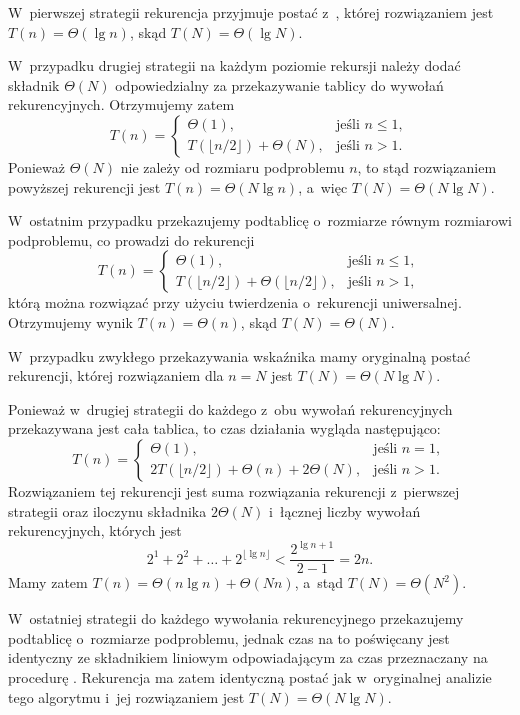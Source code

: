 
\subproblem %
W~pierwszej strategii rekurencja przyjmuje postać z~, której rozwiązaniem jest $T(n)=\Theta(\lg n)$, skąd $T(N)=\Theta(\lg N)$.

W~przypadku drugiej strategii na każdym poziomie rekursji należy dodać składnik $\Theta(N)$ odpowiedzialny za przekazywanie tablicy do wywołań rekurencyjnych.
Otrzymujemy zatem
\[
	T(n) = \begin{cases}
		\Theta(1), & \text{jeśli $n\le1$}, \\
		T(\lfloor n/2\rfloor)+\Theta(N), & \text{jeśli $n>1$}.
	\end{cases}
\]
Ponieważ $\Theta(N)$ nie zależy od rozmiaru podproblemu $n$, to stąd rozwiązaniem powyższej rekurencji jest $T(n)=\Theta(N\lg n)$, a~więc $T(N)=\Theta(N\lg N)$.

W~ostatnim przypadku przekazujemy podtablicę o~rozmiarze równym rozmiarowi podproblemu, co prowadzi do rekurencji
\[
	T(n) = \begin{cases}
		\Theta(1), & \text{jeśli $n\le1$}, \\
		T(\lfloor n/2\rfloor)+\Theta(\lfloor n/2\rfloor), & \text{jeśli $n>1$},
	\end{cases}
\]
którą można rozwiązać przy użyciu twierdzenia o~rekurencji uniwersalnej.
Otrzymujemy wynik $T(n)=\Theta(n)$, skąd $T(N)=\Theta(N)$.

\subproblem %
W~przypadku zwykłego przekazywania wskaźnika mamy oryginalną postać rekurencji, której rozwiązaniem dla $n=N$ jest $T(N)=\Theta(N\lg N)$.

Ponieważ w~drugiej strategii do każdego z~obu wywołań rekurencyjnych przekazywana jest cała tablica, to czas działania wygląda następująco:
\[
	T(n) = \begin{cases}
		\Theta(1), & \text{jeśli $n=1$}, \\
		2T(\lfloor n/2\rfloor)+\Theta(n)+2\Theta(N), & \text{jeśli $n>1$}.
	\end{cases}
\]
Rozwiązaniem tej rekurencji jest suma rozwiązania rekurencji z~pierwszej strategii oraz iloczynu składnika $2\Theta(N)$ i~łącznej liczby wywołań rekurencyjnych, których jest
\[
	2^1+2^2+\dots+2^{\lfloor\lg n\rfloor} < \frac{2^{\lg n+1}}{2-1} = 2n.
\]
Mamy zatem $T(n)=\Theta(n\lg n)+\Theta(Nn)$, a~stąd $T(N)=\Theta(N^2)$.

W~ostatniej strategii do każdego wywołania rekurencyjnego przekazujemy podtablicę o~rozmiarze podproblemu, jednak czas na to poświęcany jest identyczny ze składnikiem liniowym odpowiadającym za czas przeznaczany na procedurę .
Rekurencja ma zatem identyczną postać jak w~oryginalnej analizie tego algorytmu i~jej rozwiązaniem jest $T(N)=\Theta(N\lg N)$.
